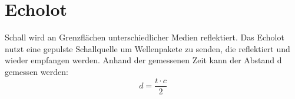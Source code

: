 \documentclass[10pt,a4paper]{article}
\begin{document}
\section{Echolot}
Schall wird an Grenzflächen unterschiedlicher Medien reflektiert.  Das Echolot nutzt eine gepulste Schallquelle um Wellenpakete zu senden, die reflektiert und wieder empfangen werden. Anhand der gemessenen Zeit kann der Abstand d gemessen werden:
\begin{equation}
d=\frac{t\cdot c}{2}
\end{equation}
\end{document}
